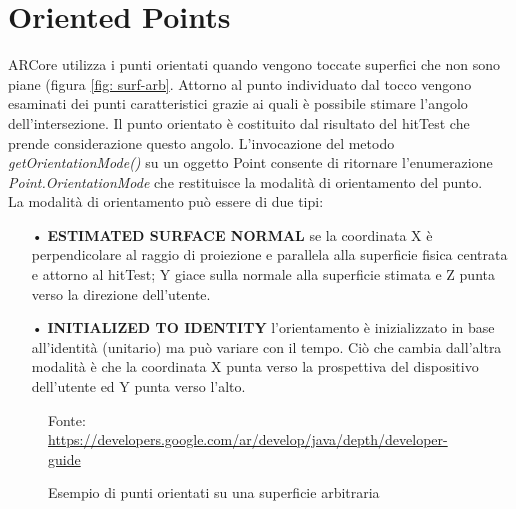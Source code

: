 \documentclass[crop=false, class=book]{standalone}
\begin{document}
		
	\chapter{Oriented Points}
	
		ARCore utilizza i punti orientati quando vengono toccate superfici che non sono piane (figura \vref{fig: surf-arb}. 			Attorno al punto individuato dal tocco vengono esaminati dei punti caratteristici grazie ai quali è 							possibile stimare l'angolo dell'intersezione. Il punto orientato è costituito dal risultato del hitTest che prende 				considerazione questo angolo. 
		L'invocazione del metodo \emph{getOrientationMode()} su un oggetto Point consente di ritornare l'enumerazione 					\emph{Point.OrientationMode} che restituisce la modalità di orientamento del punto.\\
		La modalità di orientamento può essere di due tipi:
		\begin{itemize}
			\item[•] \textbf{ESTIMATED SURFACE NORMAL} se la coordinata X è perpendicolare al raggio di proiezione e parallela alla superficie fisica centrata e attorno al hitTest; Y giace sulla normale alla superficie stimata e Z punta verso la direzione dell'utente.
			\item[•] \textbf{INITIALIZED TO IDENTITY} l'orientamento è inizializzato in base all'identità (unitario) ma può variare con il tempo. Ciò che cambia dall'altra modalità è che la coordinata X punta verso la prospettiva del dispositivo dell'utente ed Y punta verso l'alto.
		\end{itemize}
		
				
		\begin{figure}
				\centering
				{Fonte: \url{https://developers.google.com/ar/develop/java/depth/developer-guide}}
				\caption{Esempio di punti orientati su una superficie arbitraria}
				\label{fig: surf-arb}
		\end{figure}
		
		
\end{document}
